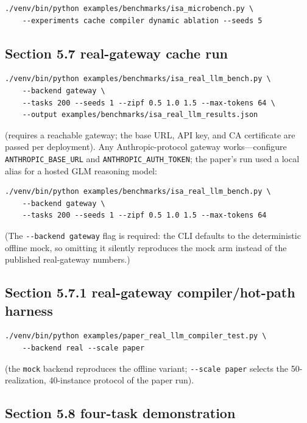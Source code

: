 \documentclass[
  11pt,
]{article}
\begin{document}
\begin{verbatim}
./venv/bin/python examples/benchmarks/isa_microbench.py \
    --experiments cache compiler dynamic ablation --seeds 5
\end{verbatim}

\subsection{Section 5.7 real-gateway cache
run}\label{section-5.7-real-gateway-cache-run}

\begin{verbatim}
./venv/bin/python examples/benchmarks/isa_real_llm_bench.py \
    --backend gateway \
    --tasks 200 --seeds 1 --zipf 0.5 1.0 1.5 --max-tokens 64 \
    --output examples/benchmarks/isa_real_llm_results.json
\end{verbatim}

(requires a reachable gateway; the base URL, API key, and CA certificate
are passed per deployment). Any Anthropic-protocol gateway
works---configure \texttt{ANTHROPIC\_BASE\_URL} and
\texttt{ANTHROPIC\_AUTH\_TOKEN}; the paper's run used a local alias for
a hosted GLM reasoning model:

\begin{verbatim}
./venv/bin/python examples/benchmarks/isa_real_llm_bench.py \
    --backend gateway \
    --tasks 200 --seeds 1 --zipf 0.5 1.0 1.5 --max-tokens 64
\end{verbatim}

(The \texttt{-\/-backend\ gateway} flag is required: the CLI defaults to
the deterministic offline mock, so omitting it silently reproduces the
mock arm instead of the published real-gateway numbers.)

\subsection{Section 5.7.1 real-gateway compiler/hot-path
harness}\label{section-5.7.1-real-gateway-compilerhot-path-harness}

\begin{verbatim}
./venv/bin/python examples/paper_real_llm_compiler_test.py \
    --backend real --scale paper
\end{verbatim}

(the \texttt{mock} backend reproduces the offline variant;
\texttt{-\/-scale\ paper} selects the 50-realization, 40-instance
protocol of the paper run).

\subsection{Section 5.8 four-task
demonstration}\label{section-5.8-four-task-demonstration}
\end{document}
